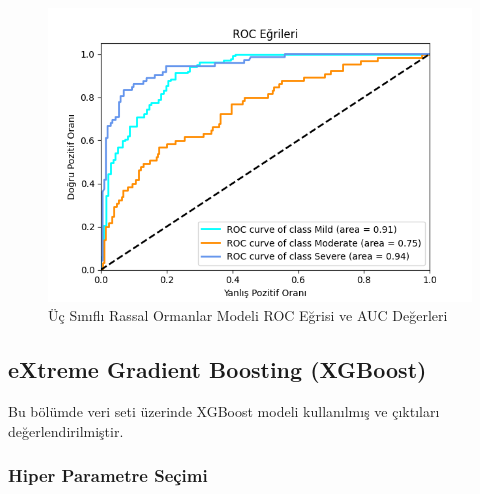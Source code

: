 \documentclass[12pt,twoside]{deuthesis}
\begin{document}
\begin{figure}

{\centering \includegraphics[width=1.05\linewidth,height=0.6\textheight]{figure/roc_curve_RandomForestClassifier} 

}

\caption{Üç Sınıflı Rassal Ormanlar Modeli ROC Eğrisi ve AUC Değerleri}\label{fig:unnamed-chunk-35}
\end{figure}
\hypertarget{mult_xgb}{%
\subsection{eXtreme Gradient Boosting (XGBoost)}\label{mult_xgb}}

Bu bölümde veri seti üzerinde XGBoost modeli kullanılmış ve çıktıları değerlendirilmiştir.

\hypertarget{hiper-parametre-seuxe7imi-2}{%
\subsubsection{Hiper Parametre Seçimi}\label{hiper-parametre-seuxe7imi-2}}
\end{document}
